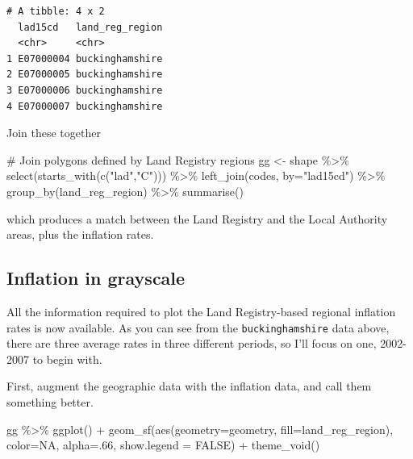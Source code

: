 \documentclass[
  letterpaper,
]{book}
\newenvironment{Shaded}{\begin{snugshade}}{\end{snugshade}}
\newcommand{\AttributeTok}[1]{\textcolor[rgb]{0.40,0.45,0.13}{#1}}
\newcommand{\CommentTok}[1]{\textcolor[rgb]{0.37,0.37,0.37}{#1}}
\newcommand{\ConstantTok}[1]{\textcolor[rgb]{0.56,0.35,0.01}{#1}}
\newcommand{\DecValTok}[1]{\textcolor[rgb]{0.68,0.00,0.00}{#1}}
\newcommand{\FunctionTok}[1]{\textcolor[rgb]{0.28,0.35,0.67}{#1}}
\newcommand{\NormalTok}[1]{\textcolor[rgb]{0.00,0.23,0.31}{#1}}
\newcommand{\OtherTok}[1]{\textcolor[rgb]{0.00,0.23,0.31}{#1}}
\newcommand{\SpecialCharTok}[1]{\textcolor[rgb]{0.37,0.37,0.37}{#1}}
\newcommand{\StringTok}[1]{\textcolor[rgb]{0.13,0.47,0.30}{#1}}
\begin{document}
\begin{verbatim}
# A tibble: 4 x 2
  lad15cd   land_reg_region
  <chr>     <chr>          
1 E07000004 buckinghamshire
2 E07000005 buckinghamshire
3 E07000006 buckinghamshire
4 E07000007 buckinghamshire
\end{verbatim}

Join these together

\begin{Shaded}
\begin{Highlighting}[]
\CommentTok{\# Join polygons defined by Land Registry regions}
\NormalTok{gg }\OtherTok{\textless{}{-}}\NormalTok{ shape }\SpecialCharTok{\%\textgreater{}\%}
  \FunctionTok{select}\NormalTok{(}\FunctionTok{starts\_with}\NormalTok{(}\FunctionTok{c}\NormalTok{(}\StringTok{"lad"}\NormalTok{,}\StringTok{"C"}\NormalTok{))) }\SpecialCharTok{\%\textgreater{}\%} 
  \FunctionTok{left\_join}\NormalTok{(codes, }\AttributeTok{by=}\StringTok{"lad15cd"}\NormalTok{) }\SpecialCharTok{\%\textgreater{}\%}
  \FunctionTok{group\_by}\NormalTok{(land\_reg\_region) }\SpecialCharTok{\%\textgreater{}\%}
  \FunctionTok{summarise}\NormalTok{() }
\end{Highlighting}
\end{Shaded}

which produces a match between the Land Registry and the Local Authority
areas, plus the inflation rates.

\hypertarget{inflation-in-grayscale}{%
\subsection{Inflation in grayscale}\label{inflation-in-grayscale}}

All the information required to plot the Land Registry-based regional
inflation rates is now available. As you can see from the
\texttt{buckinghamshire} data above, there are three average rates in
three different periods, so I'll focus on one, 2002-2007 to begin with.

First, augment the geographic data with the inflation data, and call
them something better.

\begin{Shaded}
\begin{Highlighting}[]
\NormalTok{gg }\SpecialCharTok{\%\textgreater{}\%}
  \FunctionTok{ggplot}\NormalTok{() }\SpecialCharTok{+}
  \FunctionTok{geom\_sf}\NormalTok{(}\FunctionTok{aes}\NormalTok{(}\AttributeTok{geometry=}\NormalTok{geometry, }\AttributeTok{fill=}\NormalTok{land\_reg\_region), }
          \AttributeTok{color=}\ConstantTok{NA}\NormalTok{, }\AttributeTok{alpha=}\NormalTok{.}\DecValTok{66}\NormalTok{, }\AttributeTok{show.legend =} \ConstantTok{FALSE}\NormalTok{) }\SpecialCharTok{+}
  \FunctionTok{theme\_void}\NormalTok{()}
\end{Highlighting}
\end{Shaded}
\end{document}
